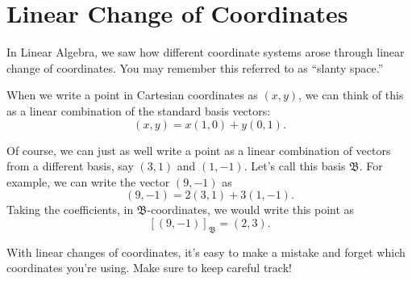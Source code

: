 \documentclass{ximera}
\begin{document}
\section*{Linear Change of Coordinates}

In Linear Algebra, we saw how different coordinate systems arose through linear change of coordinates. You may remember this referred to as ``slanty space.''

When we write a point in Cartesian coordinates as $(x,y)$, we can think of this as a linear combination of the standard basis vectors:
\[
(x,y) = x(1,0) + y(0,1).
\]

Of course, we can just as well write a point as a linear combination of vectors from a different basis, say $(3,1)$ and $(1, -1)$. Let's call this basis $\mathfrak{B}$. For example, we can write the vector $(9,-1)$ as
\[
(9,-1) = 2(3,1)+3(1,-1).
\]
Taking the coefficients, in $\mathfrak{B}$-coordinates, we would write this point as
\[
[(9,-1)]_{\mathfrak{B}}=(2,3).
\]

\begin{image}
\end{image}

With linear changes of coordinates, it's easy to make a mistake and forget which coordinates you're using. Make sure to keep careful track!
\end{document}
